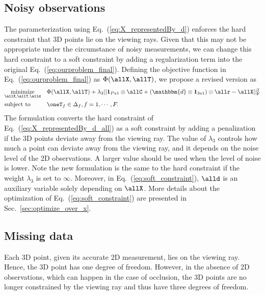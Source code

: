 \subsection{Noisy observations} \label{sec:noisy_measure}
The parameterization using Eq.~(\ref{eq:X_representedBy_d}) enforces the hard constraint that 3D points lie on the viewing rays.%
Given that this may not be appropriate under the circumstance of noisy measurements, we can change this hard constraint to a soft constraint by adding a regularization term into the original Eq.~(\ref{eq:ourproblem_final}). Defining the objective function in Eq.~(\ref{eq:ourproblem_final}) as $\Phi(\allX,\allT)$, we propose a revised version as
\begin{equation}
\begin{aligned}
& \underset{\allX, \allT, \alld}{\text{minimize}} &&\Phi(\allX,\allT) + 
\lambda_3 ||\mathbf{1}_{P\text{x}1} \otimes \allC + (\mathbbm{d} \otimes \mathbf{1}_{3\text{x}1}) \odot \allr - \allX||_{\text{F}}^2 \\
 & \text{subject to} && \oneT_f \in \Delta_f, f=1,\cdots,F.
\end{aligned}
\label{eq:soft_constraint}
\end{equation}
The formulation converts the hard constraint of Eq.~(\ref{eq:X_representedBy_d_all}) as a soft constraint by adding a penalization if the 3D points deviate away from the viewing ray. The value of $\lambda_3$ controls how much a point can deviate away from the viewing ray, and it depends on the noise level of the 2D observations. A larger value should be used when the level of noise is lower. Note the new formulation is the same to the hard constraint if the weight $\lambda_3$ is set to $\infty$. Moreover, in Eq.~(\ref{eq:soft_constraint}), $\alld$ is an auxiliary variable solely depending on $\allX$. More details about the optimization of Eq.~(\ref{eq:soft_constraint}) are presented in Sec.~\ref{sec:optimize_over_x}.

\subsection{Missing data} 
Each 3D point, given its accurate 2D measurement, lies on the viewing ray. Hence, the 3D point has one degree of freedom. However, in the absence of 2D observations, which can happen in the case of occlusion, the 3D points are no longer constrained by the viewing ray and thus have three degrees of freedom. 

